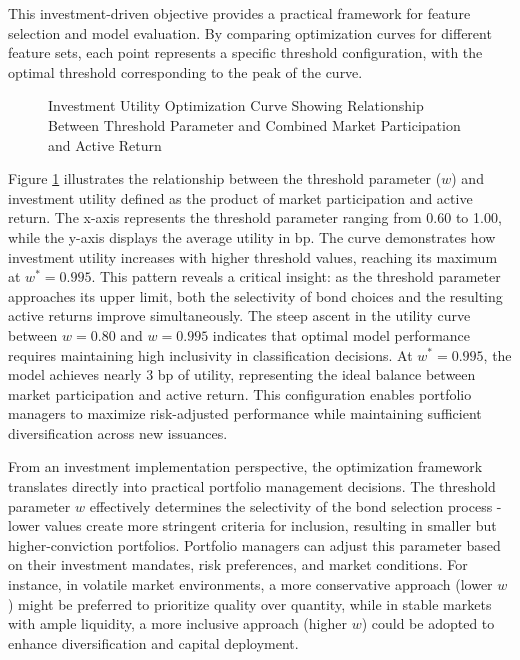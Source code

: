 This investment-driven objective provides a practical framework for feature selection and model evaluation. By comparing optimization curves for different feature sets, each point represents a specific threshold configuration, with the optimal threshold corresponding to the peak of the curve.

\begin{figure}[h]
    \begin{center}
        
    \end{center}
    \caption{Investment Utility Optimization Curve Showing Relationship Between Threshold Parameter and Combined Market Participation and Active Return}
    \label{fig:optimization_curve}
\end{figure}

Figure \ref{fig:optimization_curve} illustrates the relationship between the threshold parameter ($w$) and investment utility defined as the product of market participation and active return. The x-axis represents the threshold parameter ranging from 0.60 to 1.00, while the y-axis displays the average utility in bp. The curve demonstrates how investment utility increases with higher threshold values, reaching its maximum at $w^* = 0.995$. This pattern reveals a critical insight: as the threshold parameter approaches its upper limit, both the selectivity of bond choices and the resulting active returns improve simultaneously. The steep ascent in the utility curve between $w = 0.80$ and $w = 0.995$ indicates that optimal model performance requires maintaining high inclusivity in classification decisions. At $w^* = 0.995$, the model achieves nearly 3 bp of utility, representing the ideal balance between market participation and active return. This configuration enables portfolio managers to maximize risk-adjusted performance while maintaining sufficient diversification across new issuances.

From an investment implementation perspective, the optimization framework translates directly into practical portfolio management decisions. The threshold parameter $w$ effectively determines the selectivity of the bond selection process - lower values create more stringent criteria for inclusion, resulting in smaller but higher-conviction portfolios. Portfolio managers can adjust this parameter based on their investment mandates, risk preferences, and market conditions. For instance, in volatile market environments, a more conservative approach (lower $w$) might be preferred to prioritize quality over quantity, while in stable markets with ample liquidity, a more inclusive approach (higher $w$) could be adopted to enhance diversification and capital deployment.

